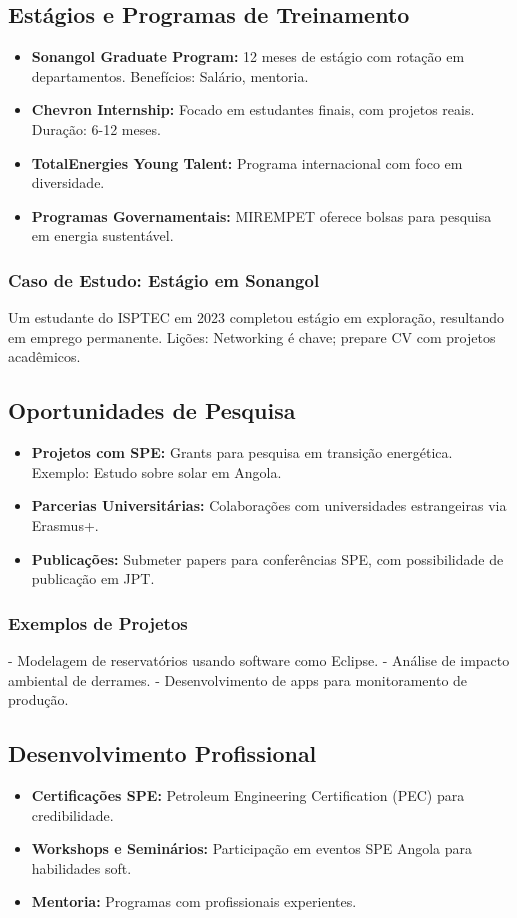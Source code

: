 \documentclass[12pt]{article}
\begin{document}
\subsection{Estágios e Programas de Treinamento}
\begin{itemize}
    \item \textbf{Sonangol Graduate Program:} 12 meses de estágio com rotação em departamentos. Benefícios: Salário, mentoria.
    \item \textbf{Chevron Internship:} Focado em estudantes finais, com projetos reais. Duração: 6-12 meses.
    \item \textbf{TotalEnergies Young Talent:} Programa internacional com foco em diversidade.
    \item \textbf{Programas Governamentais:} MIREMPET oferece bolsas para pesquisa em energia sustentável.
\end{itemize}

\subsubsection{Caso de Estudo: Estágio em Sonangol}
Um estudante do ISPTEC em 2023 completou estágio em exploração, resultando em emprego permanente. Lições: Networking é chave; prepare CV com projetos acadêmicos.

\subsection{Oportunidades de Pesquisa}
\begin{itemize}
    \item \textbf{Projetos com SPE:} Grants para pesquisa em transição energética. Exemplo: Estudo sobre solar em Angola.
    \item \textbf{Parcerias Universitárias:} Colaborações com universidades estrangeiras via Erasmus+.
    \item \textbf{Publicações:} Submeter papers para conferências SPE, com possibilidade de publicação em JPT.
\end{itemize}

\subsubsection{Exemplos de Projetos}
- Modelagem de reservatórios usando software como Eclipse.
- Análise de impacto ambiental de derrames.
- Desenvolvimento de apps para monitoramento de produção.

\subsection{Desenvolvimento Profissional}
\begin{itemize}
    \item \textbf{Certificações SPE:} Petroleum Engineering Certification (PEC) para credibilidade.
    \item \textbf{Workshops e Seminários:} Participação em eventos SPE Angola para habilidades soft.
    \item \textbf{Mentoria:} Programas com profissionais experientes.
\end{itemize}
\end{document}
